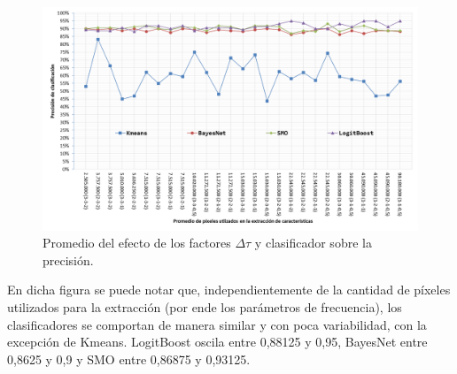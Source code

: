 \begin{figure}[H]
    \centering
    	\includegraphics[width=1\textwidth]{images/p/pix-p.png}
\caption{Promedio del efecto de los factores $\Delta \tau$ y clasificador sobre la precisión.}
\label{fig:pix-p}
\end{figure}

En dicha figura se puede notar que, independientemente de la cantidad de píxeles utilizados para la extracción (por ende los parámetros de frecuencia), los clasificadores se comportan de manera similar y con poca variabilidad, con la excepción de Kmeans. LogitBoost oscila entre 0,88125 y 0,95, BayesNet entre 0,8625 y 0,9 y SMO entre 0,86875 y 0,93125.
